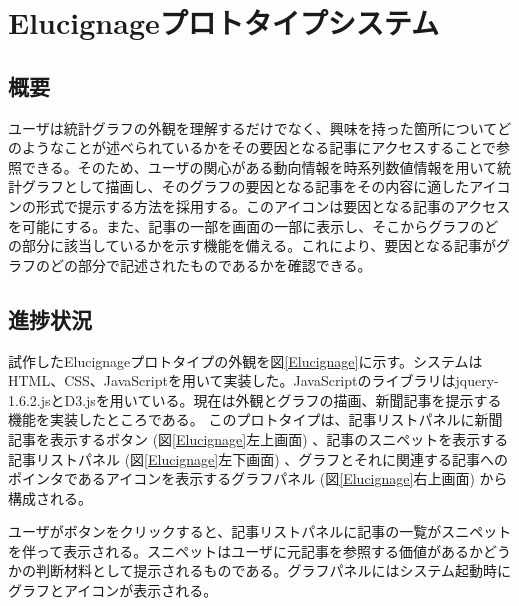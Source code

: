 \documentclass{matsushita-zemi}
\begin{document}

\section{Elucignageプロトタイプシステム}
\subsection{概要}
ユーザは統計グラフの外観を理解するだけでなく、興味を持った箇所についてどのようなことが述べられているかをその要因となる記事にアクセスすることで参照できる。そのため、ユーザの関心がある動向情報を時系列数値情報を用いて統計グラフとして描画し、そのグラフの要因となる記事をその内容に適したアイコンの形式で提示する方法を採用する。このアイコンは要因となる記事のアクセスを可能にする。また、記事の一部を画面の一部に表示し、そこからグラフのどの部分に該当しているかを示す機能を備える。これにより、要因となる記事がグラフのどの部分で記述されたものであるかを確認できる。
\subsection{進捗状況}
試作したElucignageプロトタイプの外観を図\ref{Elucignage}に示す。システムはHTML、CSS、JavaScriptを用いて実装した。JavaScriptのライブラリはjquery-1.6.2.jsとD3.jsを用いている。現在は外観とグラフの描画、新聞記事を提示する機能を実装したところである。
このプロトタイプは、記事リストパネルに新聞記事を表示するボタン (図\ref{Elucignage}左上画面) 、記事のスニペットを表示する記事リストパネル (図\ref{Elucignage}左下画面) 、グラフとそれに関連する記事へのポインタであるアイコンを表示するグラフパネル (図\ref{Elucignage}右上画面) から構成される。

ユーザがボタンをクリックすると、記事リストパネルに記事の一覧がスニペットを伴って表示される。スニペットはユーザに元記事を参照する価値があるかどうかの判断材料として提示されるものである。グラフパネルにはシステム起動時にグラフとアイコンが表示される。
\end{document}

